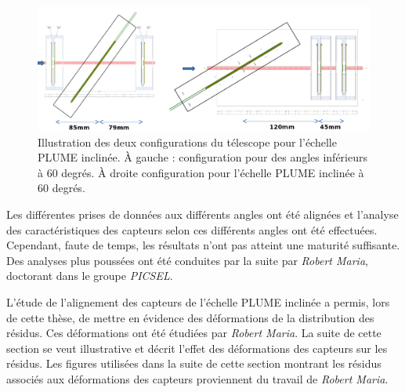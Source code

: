    \begin{figure}[!htb]
   \begin{center} 
    \includegraphics[scale=0.38]{./figures/PLULE_tilt_CONFIGs.png}
    \caption{Illustration des deux configurations du t\'elescope pour l'\'echelle PLUME inclin\'ee. \`A gauche : configuration pour des angles inf\'erieurs \`a 60 degr\'es. \`A droite configuration pour l'\'echelle PLUME inclin\'ee \`a 60 degr\'es.}
    \label{fig:tel_60deg}   
    \end{center}
   \end{figure}
  
  \medskip
  
  Les diff\'erentes prises de donn\'ees aux diff\'erents angles ont \'et\'e align\'ees et l'analyse des caract\'eristiques des capteurs selon ces diff\'erents angles ont \'et\'e effectu\'ees. Cependant, faute de temps, les r\'esultats n'ont pas atteint une maturit\'e suffisante. Des analyses plus pouss\'ees ont \'et\'e conduites par la suite par \textit{Robert Maria}, doctorant dans le groupe \textit{PICSEL}.
  
  \medskip
   
%   
%   
  L'\'etude de l'alignement des capteurs de l'\'echelle PLUME inclin\'ee a permis, lors de cette th\`ese, de mettre en \'evidence des d\'eformations de la distribution des r\'esidus. Ces d\'eformations ont \'et\'e \'etudi\'ees par \textit{Robert Maria}. La suite de cette section se veut illustrative et d\'ecrit l'effet des d\'eformations des capteurs sur les r\'esidus. Les figures utilis\'ees dans la suite de cette section montrant les r\'esidus associ\'es aux d\'eformations des capteurs proviennent du travail de \textit{Robert Maria}.
  
